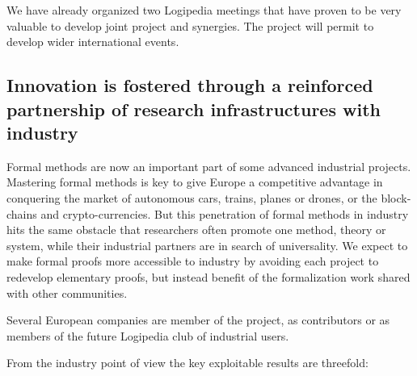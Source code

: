 We have already organized two {\sf Logipedia} meetings that have
proven to be very valuable to develop joint project and synergies.
The project will permit to develop wider international events.

\subsection{Innovation is fostered through a reinforced partnership of research
infrastructures with industry}

Formal methods are now an important part of some advanced industrial
projects. Mastering formal methods is key to give Europe a competitive
advantage in conquering the market of autonomous cars, trains, planes
or drones, or the block-chains and crypto-currencies. But this
penetration of formal methods in industry hits the same obstacle that
researchers often promote one method, theory or system, while their
industrial partners are in search of universality. We expect to make
formal proofs more accessible to industry by avoiding each project to
redevelop elementary proofs, but instead benefit of the formalization
work shared with other communities.

Several European companies are member of the project,
as contributors or as members of the future {\sf Logipedia}
club of industrial users.

From the industry point of view the key exploitable results are threefold:

